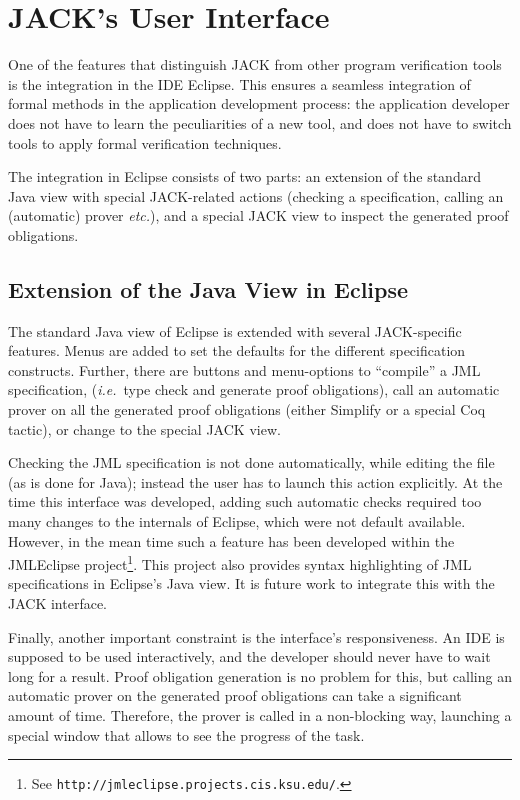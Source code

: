 \section{JACK's User Interface}\label{SecUI}

One of the features that distinguish JACK from other program
verification tools is the integration in the IDE Eclipse. This ensures
a seamless integration of formal methods in the application
development process: the application developer does not have to learn
the peculiarities of a new tool, and does not have to switch tools to
apply formal verification techniques.

The integration in Eclipse consists of two parts: an extension of the
standard Java view with special JACK-related actions (checking a
specification, calling an (automatic) prover \emph{etc.}), and a
special JACK view to inspect the generated proof
obligations.

\subsection{Extension of the Java View in Eclipse}

The standard Java view of Eclipse is extended with several
JACK-specific features. Menus are added to set the defaults for the
different specification constructs. Further, there are buttons and
menu-options to ``compile'' a JML specification, (\emph{i.e.}\ type
check and generate proof obligations), call an automatic prover on all
the generated proof obligations (either Simplify or a special
Coq tactic), or change to the special JACK view.  

Checking the JML specification is not done automatically, while
editing the file (as is done for Java); instead the user has to launch
this action explicitly. At the time this interface was developed,
adding such automatic checks required too many changes to the
internals of Eclipse, which were not default available. However, in
the mean time such a feature has been developed within the JMLEclipse
project\footnote{See
\texttt{http://jmleclipse.projects.cis.ksu.edu/}.}. This project also
provides syntax highlighting of JML specifications in Eclipse's Java
view. It is future work to integrate this with the JACK interface.

Finally, another important constraint is the interface's
responsiveness. An IDE is supposed to be used interactively, and the
developer should never have to wait long for a result. Proof
obligation generation is no problem for this, but calling an automatic
prover on the generated proof obligations can take a significant
amount of time. Therefore, the prover is called in a non-blocking way,
launching a special window that allows to see the progress of the
task.

